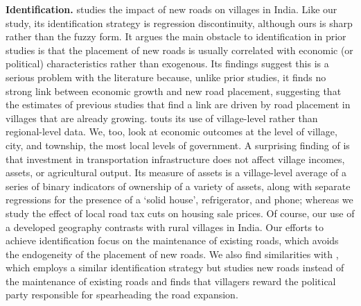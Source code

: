 {\bf Identification.} \cite{asher2020} studies the impact of new roads on villages in India. Like our study, its identification strategy is regression discontinuity, although ours is sharp rather than the fuzzy form.  It argues the main obstacle to identification in prior studies is that the placement of new roads is usually correlated with economic (or political) characteristics rather than exogenous. Its findings suggest this is a serious problem with the literature because, unlike prior studies, it finds no strong link between economic growth and new road placement, suggesting that the estimates of previous studies that find a link are driven by road placement in villages that are already growing. \cite{asher2020} touts its use of village-level rather than regional-level data.  We, too, look at economic outcomes at the level of village, city, and township, the most local levels of government. A surprising finding of \cite{asher2020} is that investment in transportation infrastructure does not affect village incomes, assets, or agricultural output. Its measure of assets is a village-level average of a series of binary indicators of ownership of a variety of assets, along with separate regressions for the presence of a ‘solid house’, refrigerator, and phone; whereas we study the effect of local road tax cuts on housing sale prices.  Of course, our use of a developed geography contrasts with rural villages in India.  Our efforts to achieve identification focus on the maintenance of existing roads, which avoids the endogeneity of the placement of new roads. We also find similarities with \cite{boudot2024paving}, which employs a similar identification strategy but studies new roads instead of the maintenance of existing roads and finds that villagers reward the political party responsible for spearheading the road expansion.



